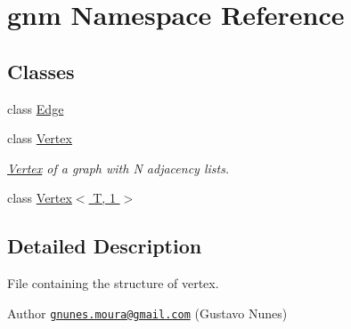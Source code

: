 \hypertarget{namespacegnm}{}\section{gnm Namespace Reference}
\label{namespacegnm}
\subsection*{Classes}
\begin{DoxyCompactItemize}
\item 
class \hyperlink{classgnm_1_1_edge}{Edge}
\item 
class \hyperlink{classgnm_1_1_vertex}{Vertex}
\begin{DoxyCompactList}\small\item\em \hyperlink{classgnm_1_1_vertex}{Vertex} of a graph with N adjacency lists. \end{DoxyCompactList}\item 
class \hyperlink{classgnm_1_1_vertex_3_01_t_00_011_01_4}{Vertex$<$ T, 1 $>$}
\end{DoxyCompactItemize}


\subsection{Detailed Description}
File containing the structure of vertex.

\begin{DoxyAuthor}{Author}
\href{mailto:gnunes.moura@gmail.com}{\tt gnunes.\+moura@gmail.\+com} (Gustavo Nunes) 
\end{DoxyAuthor}
